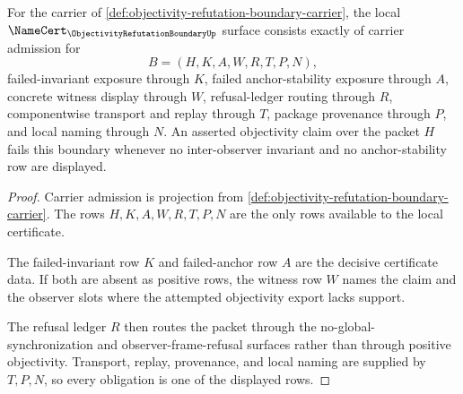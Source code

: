 \begin{theorem}
\label{thm:objectivity-refutation-boundary-namecert-obligations}
For the carrier of \autoref{def:objectivity-refutation-boundary-carrier}, the local $\NameCert_{\ObjectivityRefutationBoundaryUp}$ surface consists exactly of carrier admission for
$$
B=(H,K,A,W,R,T,P,N),
$$
failed-invariant exposure through $K$, failed anchor-stability exposure through $A$, concrete witness display through $W$, refusal-ledger routing through $R$, componentwise transport and replay through $T$, package provenance through $P$, and local naming through $N$. An asserted objectivity claim over the packet $H$ fails this boundary whenever no inter-observer invariant and no anchor-stability row are displayed.
\end{theorem}
\begin{proof}
Carrier admission is projection from \autoref{def:objectivity-refutation-boundary-carrier}. The rows $H,K,A,W,R,T,P,N$ are the only rows available to the local certificate.

The failed-invariant row $K$ and failed-anchor row $A$ are the decisive certificate data. If both are absent as positive rows, the witness row $W$ names the claim and the observer slots where the attempted objectivity export lacks support.

The refusal ledger $R$ then routes the packet through the no-global-synchronization and observer-frame-refusal surfaces rather than through positive objectivity. Transport, replay, provenance, and local naming are supplied by $T,P,N$, so every obligation is one of the displayed rows.
\end{proof}

